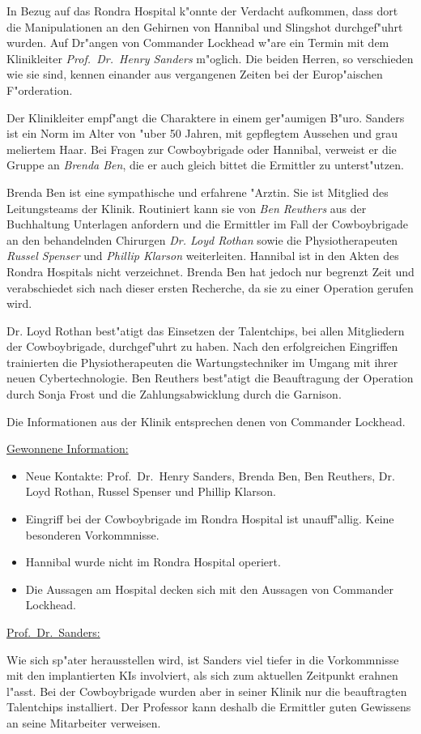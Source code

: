 
In Bezug auf das Rondra Hospital k"onnte der Verdacht aufkommen, dass dort die Manipulationen an den Gehirnen von Hannibal und Slingshot durchgef"uhrt wurden. Auf Dr"angen von Commander Lockhead w"are ein Termin mit dem Klinikleiter \emph{Prof.~Dr.~Henry Sanders} m"oglich. Die beiden Herren, so verschieden wie sie sind, kennen einander aus vergangenen Zeiten bei der Europ"aischen F"orderation.

Der Klinikleiter empf"angt die Charaktere in einem ger"aumigen B"uro. Sanders ist ein Norm im Alter von "uber 50 Jahren, mit gepflegtem Aussehen und grau meliertem Haar. Bei Fragen zur Cowboybrigade oder Hannibal, verweist er die Gruppe an \emph{Brenda Ben}, die er auch gleich bittet die Ermittler zu unterst"utzen. 

Brenda Ben ist eine sympathische und erfahrene "Arztin. Sie ist Mitglied des Leitungsteams der Klinik. Routiniert kann sie von 
\emph{Ben Reuthers} aus der Buchhaltung Unterlagen anfordern und die Ermittler im Fall der Cowboybrigade an den behandelnden Chirurgen \emph{Dr. Loyd Rothan} sowie die Physiotherapeuten \emph{Russel Spenser} und \emph{Phillip Klarson} weiterleiten. Hannibal ist in den Akten des Rondra Hospitals nicht verzeichnet. Brenda Ben hat jedoch nur begrenzt Zeit und verabschiedet sich nach dieser ersten Recherche, da sie zu einer Operation gerufen wird.

Dr. Loyd Rothan best"atigt das Einsetzen der Talentchips, bei allen Mitgliedern der Cowboybrigade, durchgef"uhrt zu haben. Nach den erfolgreichen Eingriffen trainierten die Physiotherapeuten die Wartungstechniker im Umgang mit ihrer neuen Cybertechnologie. Ben Reuthers best"atigt die Beauftragung der Operation durch Sonja Frost und die Zahlungsabwicklung durch die Garnison.

Die Informationen aus der Klinik entsprechen denen von Commander Lockhead.

\begin{remarks}
	\underline{Gewonnene Information:}
	
	\begin{itemize}
		\item Neue Kontakte: Prof.~Dr.~Henry Sanders, Brenda Ben, Ben Reuthers, Dr. Loyd Rothan, Russel Spenser und Phillip Klarson.
		\item Eingriff bei der Cowboybrigade im Rondra Hospital ist unauff"allig. Keine besonderen Vorkommnisse.
		\item Hannibal wurde nicht im Rondra Hospital operiert.
		\item Die Aussagen am Hospital decken sich mit den Aussagen von Commander Lockhead.
	\end{itemize}

	\underline{Prof.~Dr.~Sanders:}

	Wie sich sp"ater herausstellen wird, ist Sanders viel tiefer in die Vorkommnisse mit den implantierten KIs involviert, als sich zum aktuellen Zeitpunkt erahnen l"asst. Bei der Cowboybrigade wurden aber in seiner Klinik nur die beauftragten Talentchips installiert. Der Professor kann deshalb die Ermittler guten Gewissens an seine Mitarbeiter verweisen.
\end{remarks}

